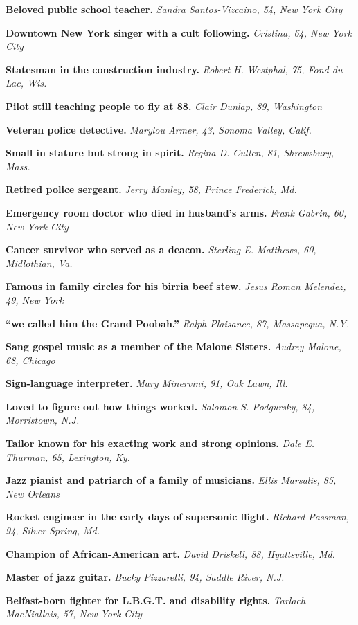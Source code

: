 \textbf{Beloved public school teacher.} \emph{Sandra Santos-Vizcaino,
54, New York City}

\textbf{Downtown New York singer with a cult following.} \emph{Cristina,
64, New York City}

\textbf{Statesman in the construction industry.} \emph{Robert H.
Westphal, 75, Fond du Lac, Wis.}

\textbf{Pilot still teaching people to fly at 88.} \emph{Clair Dunlap,
89, Washington}

\textbf{Veteran police detective.} \emph{Marylou Armer, 43, Sonoma
Valley, Calif.}

\textbf{Small in stature but strong in spirit.} \emph{Regina D. Cullen,
81, Shrewsbury, Mass.}

\textbf{Retired police sergeant.} \emph{Jerry Manley, 58, Prince
Frederick, Md.}

\textbf{Emergency room doctor who died in husband's arms.} \emph{Frank
Gabrin, 60, New York City}

\textbf{Cancer survivor who served as a deacon.} \emph{Sterling E.
Matthews, 60, Midlothian, Va.}

\textbf{Famous in family circles for his birria beef stew.} \emph{Jesus
Roman Melendez, 49, New York}

\textbf{``we called him the Grand Poobah.''} \emph{Ralph Plaisance, 87,
Massapequa, N.Y.}

\textbf{Sang gospel music as a member of the Malone Sisters.}
\emph{Audrey Malone, 68, Chicago}

\textbf{Sign-language interpreter.} \emph{Mary Minervini, 91, Oak Lawn,
Ill.}

\textbf{Loved to figure out how things worked.} \emph{Salomon S.
Podgursky, 84, Morristown, N.J.}

\textbf{Tailor known for his exacting work and strong opinions.}
\emph{Dale E. Thurman, 65, Lexington, Ky.}

\textbf{Jazz pianist and patriarch of a family of musicians.}
\emph{Ellis Marsalis, 85, New Orleans}

\textbf{Rocket engineer in the early days of supersonic flight.}
\emph{Richard Passman, 94, Silver Spring, Md.}

\textbf{Champion of African-American art.} \emph{David Driskell, 88,
Hyattsville, Md.}

\textbf{Master of jazz guitar.} \emph{Bucky Pizzarelli, 94, Saddle
River, N.J.}

\textbf{Belfast-born fighter for L.B.G.T. and disability rights.}
\emph{Tarlach MacNiallais, 57, New York City}

